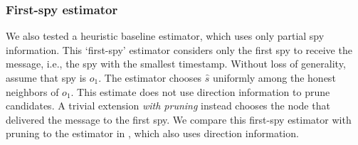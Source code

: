\subsubsection{First-spy estimator}
We also tested a heuristic baseline estimator, which uses only partial spy information. This `first-spy' estimator considers only the first spy to receive the message, i.e., the spy with the smallest timestamp. Without loss of generality, assume that spy is $o_1$. The estimator chooses $\hat s$ uniformly among the honest neighbors of $o_1$. This estimate does not use direction information to prune candidates. A trivial extension \emph{with pruning} instead chooses the node that delivered the message to the first spy. We compare this first-spy estimator with pruning to the estimator in \cite{pinto}, which also uses direction information. 